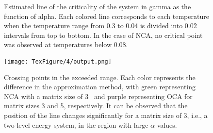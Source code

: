 \documentclass{article}[12pt]
\begin{document}
\begin{spacing}{1.5}
\begin{figure}[htbp]
  \caption{Estimated line of the criticality of the system in gamma as the function of alpha. 
  Each colored line corresponds to each temperature when the temperature range from 0.3 to 0.04 is divided into 0.02 intervals 
  from top to bottom. In the case of NCA, no critical point was observed at temperatures below 0.08.}
\end{figure}
\pagebreak
\newpage
\begin{figure}[H]
  \centerline{\texttt{[image: TexFigure/4/output.png]}}
  \caption{Crossing points in the exceeded range. Each color represents the difference in the approximation method, 
  with green representing NCA with a matrix size of 3  and purple representing OCA for matrix sizes 3 and 5, respectively. 
  It can be observed that the position of the line changes significantly for a matrix size of 3, i.e., a two-level energy system, 
  in the region with large $\alpha$ values.}
 \end{figure}
\end{spacing}
\end{document}
